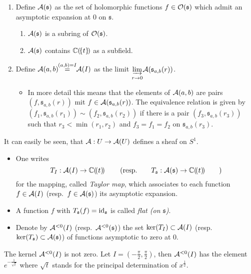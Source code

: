 \begin{defn}
  \begin{enumerate}
    \item Define $\mathcal{A}(\mathfrak{s})$ as the set of holomorphic functions
      $f\in\mathcal{O}(\mathfrak{s})$ which admit an asymptotic expansion at $0$ on
      $\mathfrak{s}$.
      \begin{rem}
        \begin{enumerate}
          \item $\mathcal{A}(\mathfrak{s})$ is a subring of $\mathcal{O}(\mathfrak{s})$.
          \item $\mathcal{A}(\mathfrak{s})$ contains $\mathbb{C}(\!\{t\}\!)$ as a subfield.
        \end{enumerate}
      \end{rem}
    \item Define $\mathcal{A}(a,b)\!\!\overset{(a,b)=I}{=}\!\!\mathcal{A}(I)$
      as the limit
      $\underset{r\to0}{\underrightarrow{\lim}}\mathcal{A}(\mathfrak{s}_{a,b}(r))$.
      \begin{itemize}
        \item[] In more detail this means that the elements of $\mathcal{A}(a,b)$
          are pairs $(f,\mathfrak{s}_{a,b}(r))$ mit
          $f\in\mathcal{A}(\mathfrak{s}_{a,b}(r))$. The equivalence relation is given
          by $(f_1,\mathfrak{s}_{a,b}(r_1))\sim(f_2,\mathfrak{s}_{a,b}(r_2))$
          if there is a pair $(f_3,\mathfrak{s}_{a,b}(r_3))$ such that
          $r_3<\min(r_1,r_2)$ and $f_3=f_1=f_2$ on $\mathfrak{s}_{a,b}(r_3)$.
      \end{itemize}
  \end{enumerate}
\end{defn}
It can easily be seen, that $\mathcal{A}:U\to\mathcal{A}(U)$ defines a sheaf on $S^1$.

\begin{defn}
  \begin{itemize}
    \item One writes
      \[
        T_{I}:\mathcal{A}(I)\to\mathbb{C}(\!(t)\!)
        \qquad\left(\text{resp.}\qquad
        T_{\mathfrak{s}}:\mathcal{A}(\mathfrak{s})\to\mathbb{C}(\!(t)\!)\qquad\right)
      \]
      for the mapping, called \emph{Taylor map}, which associates to each
      function $f\in\mathcal{A}(I)$ (resp.\ $f\in\mathcal{A}(\mathfrak{s})$) its asymptotic
      expansion.
    \item A function $f$ with $T_{\mathfrak{s}}(f)=\operatorname{id}_{\mathfrak{s}}$ is
      called \emph{flat (on $\mathfrak{s}$)}. \TODO[resp]
    \item Denote by $\mathcal{A}^{<0}(I)$ (resp.\ $\mathcal{A}^{<0}(\mathfrak{s})$) the set
      $\ker(T_{I})\subset\mathcal{A}(I)$ (resp.\
      $\ker(T_{\mathfrak{s}})\subset\mathcal{A}(\mathfrak{s})$) of functions asymptotic
      to zero at $0$.
  \end{itemize}
\end{defn}
The kernel $\mathcal{A}^{<0}(I)$ is not zero.
Let $I=\left(-\frac{\pi}{2},\frac{\pi}{2}\right)$, then $\mathcal{A}^{<0}(I)$ has the
element $e^{-\frac{1}{\sqrt{t}}}$ where $\sqrt{t}$ stands for the principal
determination of $x^{\frac{1}{2}}$.

